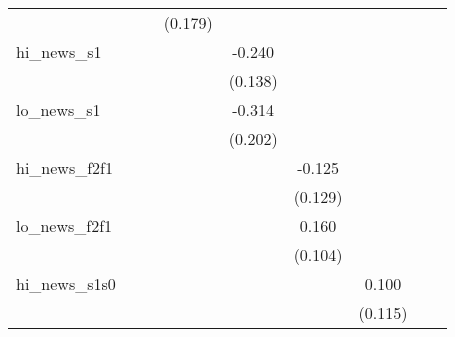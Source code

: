 {\begin{tabular}{l*{8}{c}}
            &                     &                     &     (0.179)         &                     &                     &                     &                     &                     \\
\addlinespace
hi\_news\_s1  &                     &                     &                     &      -0.240\sym{*}  &                     &                     &                     &                     \\
            &                     &                     &                     &     (0.138)         &                     &                     &                     &                     \\
\addlinespace
lo\_news\_s1  &                     &                     &                     &      -0.314         &                     &                     &                     &                     \\
            &                     &                     &                     &     (0.202)         &                     &                     &                     &                     \\
\addlinespace
hi\_news\_f2f1&                     &                     &                     &                     &      -0.125         &                     &                     &                     \\
            &                     &                     &                     &                     &     (0.129)         &                     &                     &                     \\
\addlinespace
lo\_news\_f2f1&                     &                     &                     &                     &       0.160         &                     &                     &                     \\
            &                     &                     &                     &                     &     (0.104)         &                     &                     &                     \\
\addlinespace
hi\_news\_s1s0&                     &                     &                     &                     &                     &       0.100         &                     &                     \\
            &                     &                     &                     &                     &                     &     (0.115)         &                     &                     \\

\end{tabular}}
